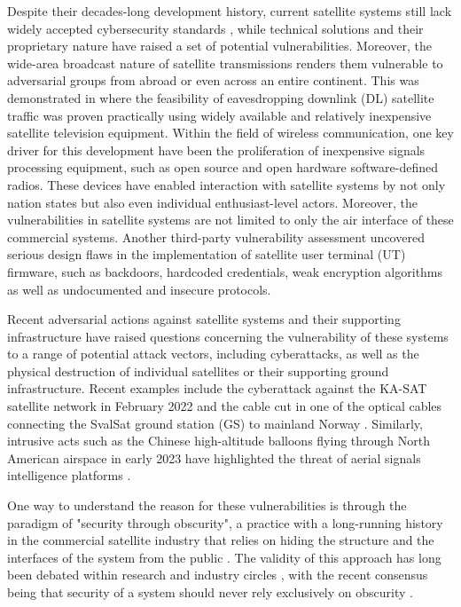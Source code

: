 \documentclass[english, 12pt, a4paper, elec, utf8, a-1b, online]{aaltothesis}
\begin{document}
Despite their decades-long development history, current satellite systems still lack widely accepted cybersecurity standards \cite{lin2022defending}, while technical solutions and their proprietary nature have raised a set of potential vulnerabilities.
Moreover, the wide-area broadcast nature of satellite transmissions renders them vulnerable to adversarial groups from abroad or even across an entire continent.
This was demonstrated in \cite{pavur2020tale} where the feasibility of eavesdropping downlink (DL) satellite traffic was proven practically using widely available and relatively inexpensive satellite television equipment.
Within the field of wireless communication, one key driver for this development have been the proliferation of inexpensive signals processing equipment, such as open source and open hardware software-defined radios.
These devices have enabled interaction with satellite systems by not only nation states but also even individual enthusiast-level actors.
Moreover, the vulnerabilities in satellite systems are not limited to only the air interface of these commercial systems.
Another third-party vulnerability assessment \cite{santamarta2014wake} uncovered serious design flaws in the implementation of satellite user terminal (UT) firmware, such as backdoors, hardcoded credentials, weak encryption algorithms as well as undocumented and insecure protocols.

Recent adversarial actions against satellite systems and their supporting infrastructure have raised questions concerning the vulnerability of these systems to a range of potential attack vectors, including cyberattacks, as well as the physical destruction of individual satellites or their supporting ground infrastructure.
Recent examples include the cyberattack against the KA-SAT satellite network in February 2022 \cite{boschetti2022space} and the cable cut in one of the optical cables connecting the SvalSat ground station (GS) to mainland Norway \cite{schia2023subsea}.
Similarly, intrusive acts such as the Chinese high-altitude balloons flying through North American airspace in early 2023 have highlighted the threat of aerial signals intelligence platforms \cite{ap-news-2023-02-balloon-signals}.

One way to understand the reason for these vulnerabilities is through the paradigm of "security through obscurity", a practice with a long-running history in the commercial satellite industry that relies on hiding the structure and the interfaces of the system from the public \cite{lin2022defending}.
The validity of this approach has long been debated within research and industry circles \cite{johansson2008great}, with the recent consensus being that security of a system should never rely exclusively on obscurity \cite{diehl2016law, guo2018defending}.
\end{document}
